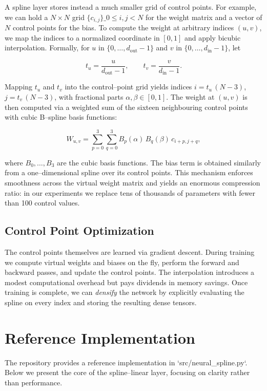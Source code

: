 \documentclass[12pt]{article}
\begin{document}
A spline layer stores instead a much smaller grid of control points.  For example, we can hold a
\(N\times N\) grid \(\{c_{i,j}\}\_{0\leq i,j<N}\) for the weight matrix and a vector of \(N\) control
points for the bias.  To compute the weight at arbitrary indices \((u,v)\), we map the indices
to a normalized coordinate in $[0,1]$ and apply bicubic interpolation.  Formally, for $u$ in
$\{0,\ldots,d_{\text{out}}-1\}$ and $v$ in $\{0,\ldots,d_{\text{in}}-1\}$, let

\[
t_u = \frac{u}{d_{\text{out}}-1}, \qquad t_v = \frac{v}{d_{\text{in}}-1}.
\]

Mapping $t_u$ and $t_v$ into the control–point grid yields indices \(i = t_u\,(N-3)\), $j = t_v\,(N-3)$,
with fractional parts \(\alpha, \beta \in [0,1]\).  The weight at $(u,v)$ is then computed via a
weighted sum of the sixteen neighbouring control points with cubic B–spline basis functions:

\[
W_{u,v} = \sum_{p=0}^3\sum_{q=0}^3 B_p(\alpha)\,B_q(\beta)\,c_{i+p,j+q},
\]

where $B_0,\dots,B_3$ are the cubic basis functions.  The bias term is obtained similarly from
a one–dimensional spline over its control points.  This mechanism enforces smoothness across
the virtual weight matrix and yields an enormous compression ratio: in our experiments we
replace tens of thousands of parameters with fewer than 100 control values.

\subsection{Control Point Optimization}

The control points themselves are learned via gradient descent.  During training we compute
virtual weights and biases on the fly, perform the forward and backward passes, and update
the control points.  The interpolation introduces a modest computational overhead but pays
dividends in memory savings.  Once training is complete, we can \emph{densify} the network by
explicitly evaluating the spline on every index and storing the resulting dense tensors.

\section{Reference Implementation}

The repository provides a reference implementation in `src/neural_spline.py`.  Below we
present the core of the spline–linear layer, focusing on clarity rather than performance.
\end{document}
